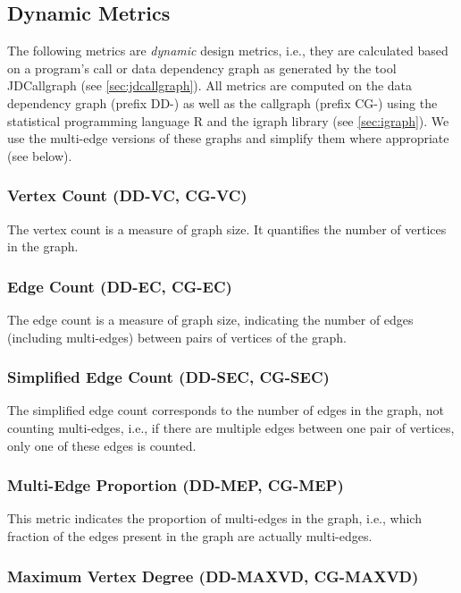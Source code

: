 \subsection{Dynamic Metrics}

The following metrics are \emph{dynamic} design metrics, i.e., they are
calculated based on a program's call or data dependency graph as generated by
the tool JDCallgraph (see \ref{sec:jdcallgraph}). All metrics are computed on
the data dependency graph (prefix DD-) as well as the callgraph (prefix CG-)
using the statistical programming language R and the igraph library (see
\ref{sec:igraph}). We use the multi-edge versions of these graphs and simplify
them where appropriate (see below).

\subsubsection{Vertex Count (DD-VC, CG-VC)}

The vertex count is a measure of graph size. It quantifies the number of
vertices in the graph.

\subsubsection{Edge Count (DD-EC, CG-EC)}

The edge count is a measure of graph size, indicating the number of edges
(including multi-edges) between pairs of vertices of the graph.

\subsubsection{Simplified Edge Count (DD-SEC, CG-SEC)}

The simplified edge count corresponds to the number of edges in the graph, not
counting multi-edges, i.e., if there are multiple edges between one pair of
vertices, only one of these edges is counted.

\subsubsection{Multi-Edge Proportion (DD-MEP, CG-MEP)}

This metric indicates the proportion of multi-edges in the graph, i.e., which
fraction of the edges present in the graph are actually multi-edges.

\subsubsection{Maximum Vertex Degree (DD-MAXVD, CG-MAXVD)}

